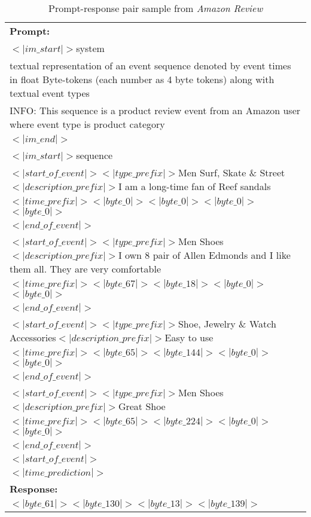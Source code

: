 \begin{table}[h]
\small
\begin{tabular}{|p{}|}
\hline
\vspace{0.1cm}
\textbf{Prompt:} \\
$<|im\_start|>$system \\
textual representation of an event sequence denoted by event times in float Byte-tokens (each number as 4 byte tokens) along with textual event types \\
INFO: This sequence is a product review event from an Amazon user where event type is product category \\
$<|im\_end|>$ \\
$<|im\_start|>$sequence \\
$<|start\_of\_event|>$$<|type\_prefix|>$Men Surf, Skate \& Street$<|description\_prefix|>$I am a long-time fan of Reef sandals \\
$<|time\_prefix|>$$<|byte\_0|>$$<|byte\_0|>$$<|byte\_0|>$$<|byte\_0|>$ \\
$<|end\_of\_event|>$ \\
$<|start\_of\_event|>$$<|type\_prefix|>$Men Shoes$<|description\_prefix|>$I own 8 pair of Allen Edmonds and I like them all.  They are very comfortable \\
$<|time\_prefix|>$$<|byte\_67|>$$<|byte\_18|>$$<|byte\_0|>$$<|byte\_0|>$ \\
$<|end\_of\_event|>$ \\
$<|start\_of\_event|>$$<|type\_prefix|>$Shoe, Jewelry \& Watch Accessories$<|description\_prefix|>$Easy to use \\
$<|time\_prefix|>$$<|byte\_65|>$$<|byte\_144|>$$<|byte\_0|>$$<|byte\_0|>$ \\
$<|end\_of\_event|>$ \\
$<|start\_of\_event|>$$<|type\_prefix|>$Men Shoes$<|description\_prefix|>$Great Shoe \\
$<|time\_prefix|>$$<|byte\_65|>$$<|byte\_224|>$$<|byte\_0|>$$<|byte\_0|>$ \\
$<|end\_of\_event|>$ \\
$<|start\_of\_event|>$ \\
$<|time\_prediction|>$ \\
\hline
\vspace{0.1cm}
\textbf{Response:} \\
$<|byte\_61|>$$<|byte\_130|>$$<|byte\_13|>$$<|byte\_139|>$ \\
\hline
\end{tabular}
\caption{Prompt-response pair sample from \textit{Amazon Review}}\label{tab:prompt_response}
\end{table}


